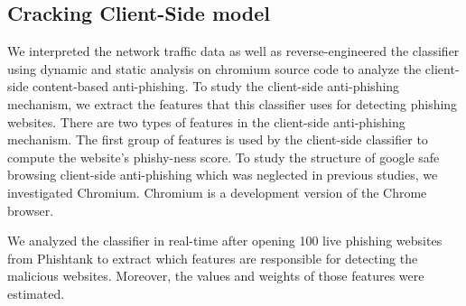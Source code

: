 \documentclass[letterpaper,twocolumn,10pt]{article}
\begin{document}
\subsection{Cracking Client-Side model}


We interpreted the network traffic data as well as reverse-engineered the classifier using dynamic and static analysis on chromium source code to analyze the client-side content-based anti-phishing.
To study the client-side anti-phishing mechanism, we extract the features that this classifier uses for detecting phishing websites. There are two types of features in the client-side anti-phishing mechanism. The first group of features is used by the client-side classifier to compute the website's phishy-ness score. To study the structure of google safe browsing client-side anti-phishing which was neglected in previous studies, we investigated Chromium. Chromium is a development version of the Chrome browser. 


We analyzed the classifier in real-time after opening 100 live phishing websites from Phishtank to extract which features are responsible for detecting the malicious websites. Moreover, the values and weights of those features were estimated.

\end{document}
